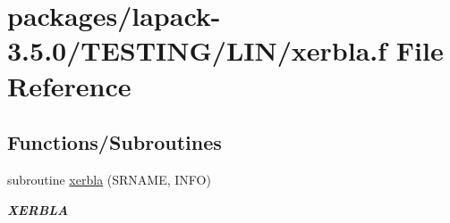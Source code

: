 \hypertarget{lapack-3_85_80_2TESTING_2LIN_2xerbla_8f}{}\section{packages/lapack-\/3.5.0/\+T\+E\+S\+T\+I\+N\+G/\+L\+I\+N/xerbla.f File Reference}
\label{lapack-3_85_80_2TESTING_2LIN_2xerbla_8f}
\subsection*{Functions/\+Subroutines}
\begin{DoxyCompactItemize}
\item 
subroutine \hyperlink{group__aux__eig_ga377ee61015baf8dea7770b3a404b1c07}{xerbla} (S\+R\+N\+A\+M\+E, I\+N\+F\+O)
\begin{DoxyCompactList}\small\item\em {\bfseries X\+E\+R\+B\+L\+A} \end{DoxyCompactList}\end{DoxyCompactItemize}
